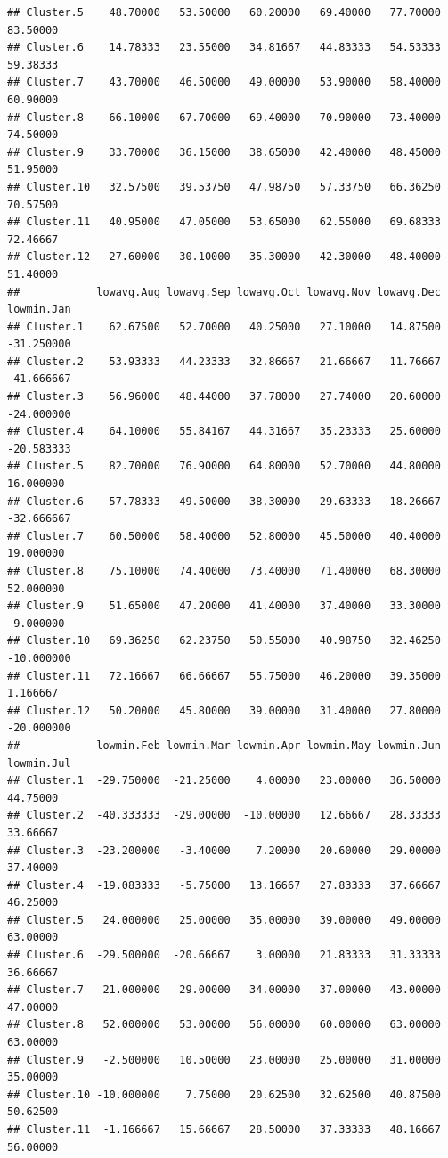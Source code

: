 \documentclass[
]{article}
\begin{document}
\begin{verbatim}
## Cluster.5    48.70000   53.50000   60.20000   69.40000   77.70000   83.50000
## Cluster.6    14.78333   23.55000   34.81667   44.83333   54.53333   59.38333
## Cluster.7    43.70000   46.50000   49.00000   53.90000   58.40000   60.90000
## Cluster.8    66.10000   67.70000   69.40000   70.90000   73.40000   74.50000
## Cluster.9    33.70000   36.15000   38.65000   42.40000   48.45000   51.95000
## Cluster.10   32.57500   39.53750   47.98750   57.33750   66.36250   70.57500
## Cluster.11   40.95000   47.05000   53.65000   62.55000   69.68333   72.46667
## Cluster.12   27.60000   30.10000   35.30000   42.30000   48.40000   51.40000
##            lowavg.Aug lowavg.Sep lowavg.Oct lowavg.Nov lowavg.Dec lowmin.Jan
## Cluster.1    62.67500   52.70000   40.25000   27.10000   14.87500 -31.250000
## Cluster.2    53.93333   44.23333   32.86667   21.66667   11.76667 -41.666667
## Cluster.3    56.96000   48.44000   37.78000   27.74000   20.60000 -24.000000
## Cluster.4    64.10000   55.84167   44.31667   35.23333   25.60000 -20.583333
## Cluster.5    82.70000   76.90000   64.80000   52.70000   44.80000  16.000000
## Cluster.6    57.78333   49.50000   38.30000   29.63333   18.26667 -32.666667
## Cluster.7    60.50000   58.40000   52.80000   45.50000   40.40000  19.000000
## Cluster.8    75.10000   74.40000   73.40000   71.40000   68.30000  52.000000
## Cluster.9    51.65000   47.20000   41.40000   37.40000   33.30000  -9.000000
## Cluster.10   69.36250   62.23750   50.55000   40.98750   32.46250 -10.000000
## Cluster.11   72.16667   66.66667   55.75000   46.20000   39.35000   1.166667
## Cluster.12   50.20000   45.80000   39.00000   31.40000   27.80000 -20.000000
##            lowmin.Feb lowmin.Mar lowmin.Apr lowmin.May lowmin.Jun lowmin.Jul
## Cluster.1  -29.750000  -21.25000    4.00000   23.00000   36.50000   44.75000
## Cluster.2  -40.333333  -29.00000  -10.00000   12.66667   28.33333   33.66667
## Cluster.3  -23.200000   -3.40000    7.20000   20.60000   29.00000   37.40000
## Cluster.4  -19.083333   -5.75000   13.16667   27.83333   37.66667   46.25000
## Cluster.5   24.000000   25.00000   35.00000   39.00000   49.00000   63.00000
## Cluster.6  -29.500000  -20.66667    3.00000   21.83333   31.33333   36.66667
## Cluster.7   21.000000   29.00000   34.00000   37.00000   43.00000   47.00000
## Cluster.8   52.000000   53.00000   56.00000   60.00000   63.00000   63.00000
## Cluster.9   -2.500000   10.50000   23.00000   25.00000   31.00000   35.00000
## Cluster.10 -10.000000    7.75000   20.62500   32.62500   40.87500   50.62500
## Cluster.11  -1.166667   15.66667   28.50000   37.33333   48.16667   56.00000

\end{verbatim}
\end{document}
